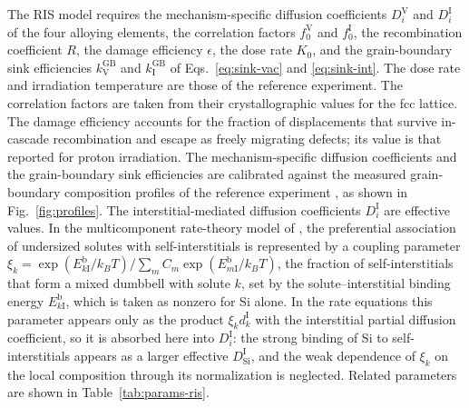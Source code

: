 \documentclass[3p,times]{elsarticle} %
\newcommand{\textcite}[1]{\citet{#1}}
\newcommand{\Vac}{\mathrm{V}}          %
\newcommand{\Int}{\mathrm{I}}          %
\newcommand{\GB}{\mathrm{GB}}
\begin{document}
The RIS model requires the mechanism-specific diffusion coefficients
\(D_i^{\Vac}\) and \(D_i^{\Int}\) of the four alloying elements, the correlation
factors \(f_0^{\Vac}\) and \(f_0^{\Int}\), the recombination coefficient \(R\),
the damage efficiency \(\epsilon\), the dose rate \(K_0\), and the grain-boundary
sink efficiencies \(k_{\Vac}^{\GB}\) and \(k_{\Int}^{\GB}\) of
Eqs.~\eqref{eq:sink-vac} and \eqref{eq:sink-int}. The dose rate and
irradiation temperature are those of the reference experiment. The correlation
factors are taken from their crystallographic values for the fcc lattice. The
damage efficiency accounts for the fraction of displacements that survive
in-cascade recombination and escape as freely migrating defects; its value is
that reported for proton irradiation. The mechanism-specific diffusion
coefficients and the grain-boundary sink efficiencies are calibrated against the measured grain-boundary composition
profiles of the reference experiment \cite{deng2021grain}, as shown in Fig.~\ref{fig:profiles}. The interstitial-mediated diffusion coefficients \(D_i^{\Int}\) are effective
values. In the multicomponent rate-theory model of
\textcite{fukuya2009multicomponent}, the preferential association of
undersized solutes with self-interstitials is represented by a coupling
parameter
\(\xi_k=\exp(E^{\mathrm{b}}_{k\Int}/k_BT)\big/\sum_m C_m\exp(E^{\mathrm{b}}_{m\Int}/k_BT)\),
the fraction of self-interstitials that form a mixed dumbbell with solute
\(k\), set by the solute--interstitial binding energy
\(E^{\mathrm{b}}_{k\Int}\), which is taken as nonzero for Si alone. In the
rate equations this parameter appears only as the product
\(\xi_k d_k^{\Int}\) with the interstitial partial diffusion coefficient, so
it is absorbed here into \(D_i^{\Int}\): the strong binding of Si to
self-interstitials appears as a larger effective \(D_{\mathrm{Si}}^{\Int}\),
and the weak dependence of \(\xi_k\) on the local composition through its
normalization is neglected. Related parameters are shown in Table~\ref{tab:params-ris}.
\end{document}
